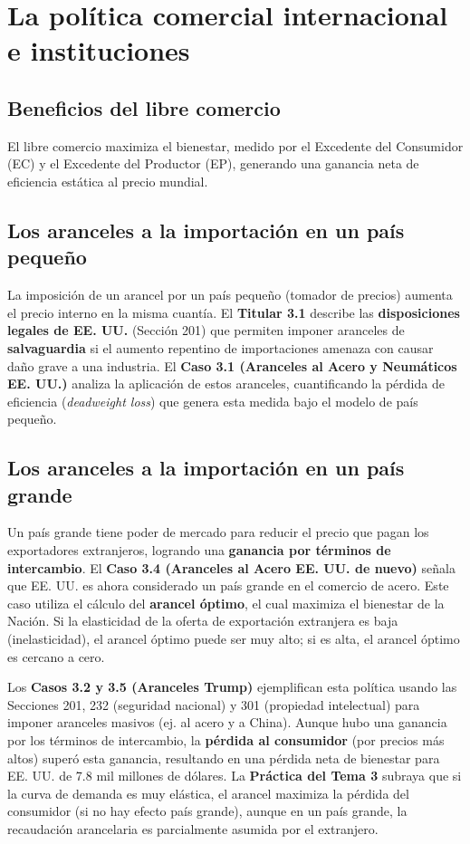 \section{La política comercial internacional e instituciones}

\subsection{Beneficios del libre comercio}
El libre comercio maximiza el bienestar, medido por el Excedente del Consumidor (EC) y el Excedente del Productor (EP), generando una ganancia neta de eficiencia estática al precio mundial.

\subsection{Los aranceles a la importación en un país pequeño}
La imposición de un arancel por un país pequeño (tomador de precios) aumenta el precio interno en la misma cuantía. El \textbf{Titular 3.1} describe las \textbf{disposiciones legales de EE. UU.} (Sección 201) que permiten imponer aranceles de \textbf{salvaguardia} si el aumento repentino de importaciones amenaza con causar daño grave a una industria. El \textbf{Caso 3.1 (Aranceles al Acero y Neumáticos EE. UU.)} analiza la aplicación de estos aranceles, cuantificando la pérdida de eficiencia (\textit{deadweight loss}) que genera esta medida bajo el modelo de país pequeño.

\subsection{Los aranceles a la importación en un país grande}
Un país grande tiene poder de mercado para reducir el precio que pagan los exportadores extranjeros, logrando una \textbf{ganancia por términos de intercambio}. El \textbf{Caso 3.4 (Aranceles al Acero EE. UU. de nuevo)} señala que EE. UU. es ahora considerado un país grande en el comercio de acero. Este caso utiliza el cálculo del \textbf{arancel óptimo}, el cual maximiza el bienestar de la Nación. Si la elasticidad de la oferta de exportación extranjera es baja (inelasticidad), el arancel óptimo puede ser muy alto; si es alta, el arancel óptimo es cercano a cero.

Los \textbf{Casos 3.2 y 3.5 (Aranceles Trump)} ejemplifican esta política usando las Secciones 201, 232 (seguridad nacional) y 301 (propiedad intelectual) para imponer aranceles masivos (ej. al acero y a China). Aunque hubo una ganancia por los términos de intercambio, la \textbf{pérdida al consumidor} (por precios más altos) superó esta ganancia, resultando en una pérdida neta de bienestar para EE. UU. de 7.8 mil millones de dólares. La \textbf{Práctica del Tema 3} subraya que si la curva de demanda es muy elástica, el arancel maximiza la pérdida del consumidor (si no hay efecto país grande), aunque en un país grande, la recaudación arancelaria es parcialmente asumida por el extranjero.

